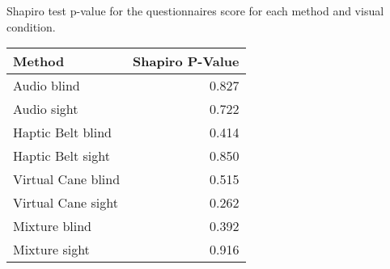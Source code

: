 
\centering
\caption{Shapiro test p-value for the questionnaires score for each method and visual condition.}
\label{tab:shapiro_questionnaires}
\begin{tabular}{lr}
\toprule
            Method &  Shapiro P-Value \\
\midrule
       Audio blind &            0.827 \\
       Audio sight &            0.722 \\
 Haptic Belt blind &            0.414 \\
 Haptic Belt sight &            0.850 \\
Virtual Cane blind &            0.515 \\
Virtual Cane sight &            0.262 \\
     Mixture blind &            0.392 \\
     Mixture sight &            0.916 \\
\bottomrule
\end{tabular}
